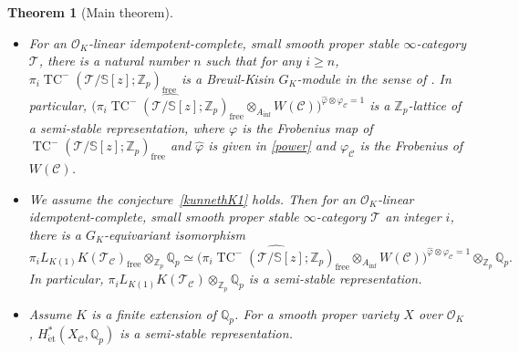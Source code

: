 \documentclass[11pt]{amsart}
\newcommand{\Q}{\mathbb{Q}}
\newcommand{\Z}{\mathbb{Z}}
\newcommand{\sO}{\mathcal{O}}
\newcommand{\sT}{\mathcal{T}}
\newcommand{\bS}{\mathbb{S}}
\newcommand{\free}{\operatorname{{free}}}
\newcommand{\LK}{{L_{K(1)}}}
\newcommand{\TCn}{\operatorname{TC}^{-}}
\newcommand{\et}{{\operatorname{\acute{e}t}}}
\newcommand{\Ainf}{A_{\operatorname{inf}}}
\newcommand{\Cu}{\mathcal{C}}
\newtheorem{thm}[lemma]{Theorem}
\theoremstyle{definition}
\theoremstyle{remark}
\numberwithin{equation}{section}
\begin{document}
\begin{thm}[Main theorem]\label{mainwithproof}
\begin{itemize}
  \item[(1)] For an $\sO_K$-linear idempotent-complete, small smooth proper stable $\infty$-category $\sT$, there is a natural number $n$ such that for any $i\geq n$, $\pi_i \TCn(\sT/\bS[z];\Z_p)_{\free}$ is a Breuil-Kisin $G_K$-module in the sense of \cite{Gao}. In particular, $\bigl( \widehat{\pi_i\TCn(\sT/\bS[z];\Z_p)_{\free}}\otimes_{\Ainf} W(\Cu) \bigr)^{\widehat{\varphi}\otimes\varphi_{\Cu}=1}$ is a $\Z_p$-lattice of a semi-stable representation, where $\varphi$ is the Frobenius map of $\TCn(\sT/\bS[z];\Z_p)_{\free}$ and $\widehat{\varphi}$ is given in \eqref{power} and $\varphi_{\Cu}$ is the Frobenius of $W(\Cu)$.

  \item[(2)] We assume the conjecture~\ref{kunnethK1} holds. Then for an $\sO_K$-linear idempotent-complete, small smooth proper stable $\infty$-category $\sT$ an integer $i$, there is a $G_K$-equivariant isomorphism
\[
\pi_i \LK K(\sT_{\Cu})_{\free}\otimes_{\Z_p}\Q_p \simeq \bigl( \widehat{\pi_i\TCn(\sT/\bS[z];\Z_p)_{\free}}\otimes_{\Ainf} W(\Cu) \bigr)^{\widehat{\varphi}\otimes \varphi_{\Cu}=1}\otimes_{\Z_p}\Q_p.
\]
In particular, $\pi_i \LK K(\sT_{\Cu})\otimes_{\Z_p}\Q_p$ is a semi-stable representation.

\item[(3)] Assume $K$ is a finite extension of $\Q_p$. For a smooth proper variety $X$ over $\sO_K$, $H^*_\et(X_{\Cu},\Q_p)$ is a semi-stable representation. 
\end{itemize}
\end{thm}
\end{document}
